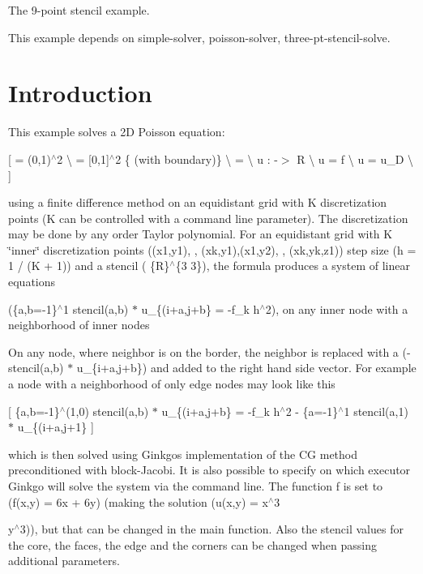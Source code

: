 The 9-\/point stencil example.

This example depends on simple-\/solver, poisson-\/solver, three-\/pt-\/stencil-\/solve.

 \label{_Intro}%
 \label{_Introduction}%
\section*{Introduction}

This example solves a 2D Poisson equation\+:

\mbox{[}  = (0,1)$^\wedge$2 \textbackslash{}  = \mbox{[}0,1\mbox{]}$^\wedge$2 \{ (with boundary)\} \textbackslash{}  =    \textbackslash{} u \+:  -\/$>$ R \textbackslash{} u\textquotesingle{}\textquotesingle{} = f   \textbackslash{} u = u\+\_\+D   \textbackslash{} \mbox{]}

using a finite difference method on an equidistant grid with {\ttfamily K} discretization points ({\ttfamily K} can be controlled with a command line parameter). The discretization may be done by any order Taylor polynomial. For an equidistant grid with K \char`\"{}inner\char`\"{} discretization points ((x1,y1), , (xk,y1),(x1,y2), , (xk,yk,z1)) step size (h = 1 / (K + 1)) and a stencil ( \{R\}$^\wedge$\{3  3\}), the formula produces a system of linear equations

(\{a,b=-\/1\}$^\wedge$1 stencil(a,b) $\ast$ u\+\_\+\{(i+a,j+b\} = -\/f\+\_\+k h$^\wedge$2), on any inner node with a neighborhood of inner nodes

On any node, where neighbor is on the border, the neighbor is replaced with a (-\/stencil(a,b) $\ast$ u\+\_\+\{i+a,j+b\}) and added to the right hand side vector. For example a node with a neighborhood of only edge nodes may look like this

\mbox{[} \{a,b=-\/1\}$^\wedge$(1,0) stencil(a,b) $\ast$ u\+\_\+\{(i+a,j+b\} = -\/f\+\_\+k h$^\wedge$2 -\/ \{a=-\/1\}$^\wedge$1 stencil(a,1) $\ast$ u\+\_\+\{(i+a,j+1\} \mbox{]}

which is then solved using Ginkgo\textquotesingle{}s implementation of the CG method preconditioned with block-\/\+Jacobi. It is also possible to specify on which executor Ginkgo will solve the system via the command line. The function {\ttfamily f} is set to (f(x,y) = 6x + 6y) (making the solution (u(x,y) = x$^\wedge$3
\begin{DoxyItemize}
\item y$^\wedge$3)), but that can be changed in the {\ttfamily main} function. Also the stencil values for the core, the faces, the edge and the corners can be changed when passing additional parameters.
\end{DoxyItemize}

